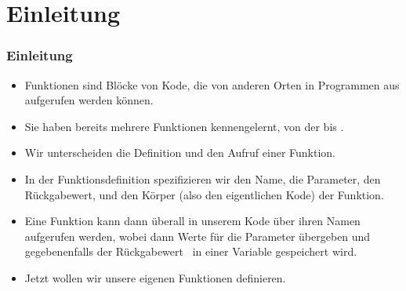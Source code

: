 \documentclass[aspectratio=169,mathserif,notheorems]{beamer}%
\subtitle{26.~Funktionen definieren und aufrufen}%
\begin{document}
%
%
\startPresentation%
%
\section{Einleitung}%
\begin{frame}%
\frametitle{Einleitung}%
\begin{itemize}%
%
\item Funktionen sind Blöcke von Kode, die von anderen Orten in Programmen aus aufgerufen werden können.%
%
\item<2-> Sie haben bereits mehrere Funktionen kennengelernt, von der  bis .%
%
\item<3-> Wir unterscheiden die Definition und den Aufruf einer Funktion.%
%
\item<4-> In der Funktionsdefinition spezifizieren wir den Name, die Parameter, den Rückgabewert, und den Körper (also den eigentlichen Kode) der Funktion.%
%
\item<5-> Eine Funktion kann dann überall in unserem Kode über ihren Namen aufgerufen werden, wobei dann Werte für die Parameter übergeben und gegebenenfalls der Rückgabewert \DEzB\ in einer Variable gespeichert wird.%
%
\item<6-> Jetzt wollen wir unsere eigenen Funktionen definieren.%
%
%
\end{itemize}%
\end{frame}%
%
\end{document}
